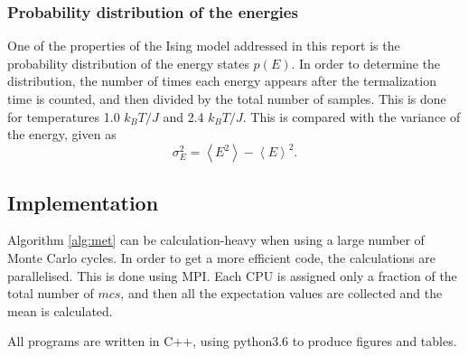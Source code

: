 \subsubsection{Probability distribution of the energies}
One of the properties of the Ising model addressed in this report is the probability distribution of the energy states $p(E)$. In order to determine the distribution, the number of times each energy appears after the termalization time is counted, and then divided by the total number of samples. This is done for temperatures 1.0 $k_BT/J$ and 2.4 $k_BT/J$. This is compared with the variance of the energy, given as
\begin{equation}
 \sigma_E^2 = \left\langle E^2\right\rangle - \left\langle E\right\rangle^2 .
\end{equation}  
 
\subsection{Implementation}
Algorithm \ref{alg:met} can be calculation-heavy when using a large number of Monte Carlo cycles. In order to get a more efficient code, the calculations are parallelised. This is done using MPI. Each CPU is assigned only a fraction of the total number of $mcs$, and then all the  expectation values are collected and the mean is calculated. 

All programs are written in C++, using python3.6 to produce figures and tables.   
